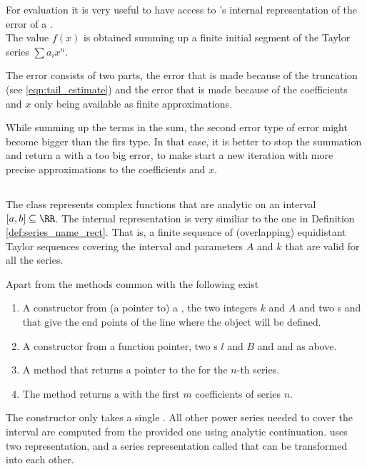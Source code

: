     For evaluation it is very useful to have access to {\irram}'s internal representation of the error of a \real. \\
    The value $f(x)$ is obtained summing up a finite initial segment of the Taylor series $ \sum a_i x^n $.

    The error consists of two parts, the error that is made because of the truncation (see \ref{eqn:tail_estimate}) and 
    the error that is made because of the coefficients and $x$ only being available as finite approximations. 
    
    While summing up the terms in the sum, the second error type of error might become bigger than the firs type.
    In that case, it is better to stop the summation and return a \real with a too big error, to make \irram start a new 
    iteration with more precise approximations to the coefficients and $x$.
   
	\subsection{\anarect}
		The class \anarect represents complex functions that are analytic on an interval $[a, b] \subseteq \RR$.
		The internal representation is very similiar to the one in Definition \ref{def:series_name_rect}.
		That is, a finite sequence of (overlapping) equidistant Taylor sequences covering the interval and parameters $A$ and $k$ 
		that are valid for all the series.

		Apart from the methods common with \baana the following exist
		\begin{enumerate}
      \item A constructor from (a pointer to) a \powerseries, the two integers $k$ and $A$ and two {\real}s  and 
            that give the end points of the line where the \anarect object will be defined.
      \item A constructor from a function pointer, two s $l$ and $B$ and  and  as above.
      \item A method  that returns a pointer to the \powerseries for the $n$-th series.
      \item The method  returns a \poly with the first $m$ coefficients of series $n$. 
		\end{enumerate}
		The constructor only takes a single \powerseries.
		All other power series needed to cover the interval are computed from the provided one using analytic 
		continuation.  
		\textbf{\anarect} uses two representation,  and a series representation called  that can be transformed into each other.

